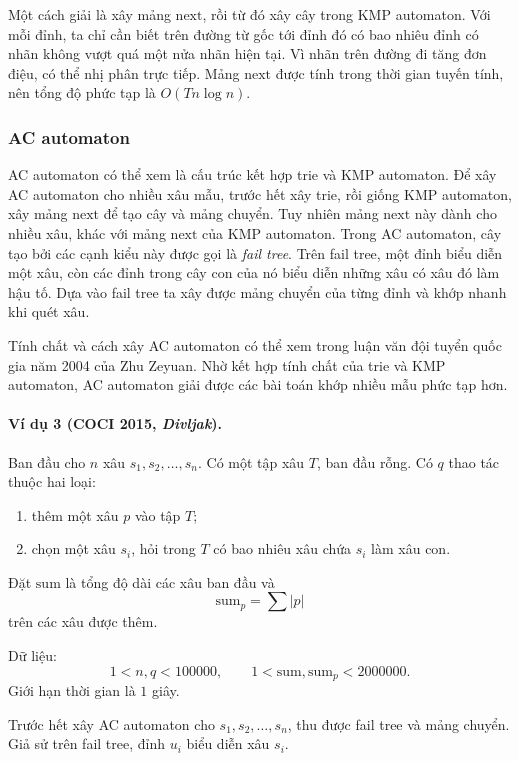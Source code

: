 \documentclass[11pt]{article}
\begin{document}
Một cách giải là xây mảng \(\mathrm{next}\), rồi từ đó xây cây trong KMP
automaton. Với mỗi đỉnh, ta chỉ cần biết trên đường từ gốc tới đỉnh đó có bao
nhiêu đỉnh có nhãn không vượt quá một nửa nhãn hiện tại. Vì nhãn trên đường đi
tăng đơn điệu, có thể nhị phân trực tiếp. Mảng \(\mathrm{next}\) được tính trong
thời gian tuyến tính, nên tổng độ phức tạp là \(O(Tn\log n)\).

\subsubsection{AC automaton}

AC automaton có thể xem là cấu trúc kết hợp trie và KMP automaton. Để xây AC
automaton cho nhiều xâu mẫu, trước hết xây trie, rồi giống KMP automaton, xây
mảng \(\mathrm{next}\) để tạo cây và mảng chuyển. Tuy nhiên mảng
\(\mathrm{next}\) này dành cho nhiều xâu, khác với mảng \(\mathrm{next}\) của
KMP automaton. Trong AC automaton, cây tạo bởi các cạnh kiểu này được gọi là
\emph{fail tree}. Trên fail tree, một đỉnh biểu diễn một xâu, còn các đỉnh
trong cây con của nó biểu diễn những xâu có xâu đó làm hậu tố. Dựa vào fail tree
ta xây được mảng chuyển của từng đỉnh và khớp nhanh khi quét xâu.

Tính chất và cách xây AC automaton có thể xem trong luận văn đội tuyển quốc gia
năm 2004 của Zhu Zeyuan. Nhờ kết hợp tính chất của trie và KMP automaton, AC
automaton giải được các bài toán khớp nhiều mẫu phức tạp hơn.

\paragraph{Ví dụ 3 (COCI 2015, \emph{Divljak}).}
Ban đầu cho \(n\) xâu \(s_1,s_2,\ldots,s_n\). Có một tập xâu \(T\), ban đầu
rỗng. Có \(q\) thao tác thuộc hai loại:
\begin{enumerate}
  \item thêm một xâu \(p\) vào tập \(T\);
  \item chọn một xâu \(s_i\), hỏi trong \(T\) có bao nhiêu xâu chứa \(s_i\) làm
  xâu con.
\end{enumerate}
Đặt \(\mathrm{sum}\) là tổng độ dài các xâu ban đầu và
\[
  \mathrm{sum}_p=\sum |p|
\]
trên các xâu được thêm.

Dữ liệu:
\[
  1<n,q<100000,\qquad 1<\mathrm{sum},\mathrm{sum}_p<2000000.
\]
Giới hạn thời gian là \(1\) giây.

Trước hết xây AC automaton cho \(s_1,s_2,\ldots,s_n\), thu được fail tree và
mảng chuyển. Giả sử trên fail tree, đỉnh \(u_i\) biểu diễn xâu \(s_i\).
\end{document}
